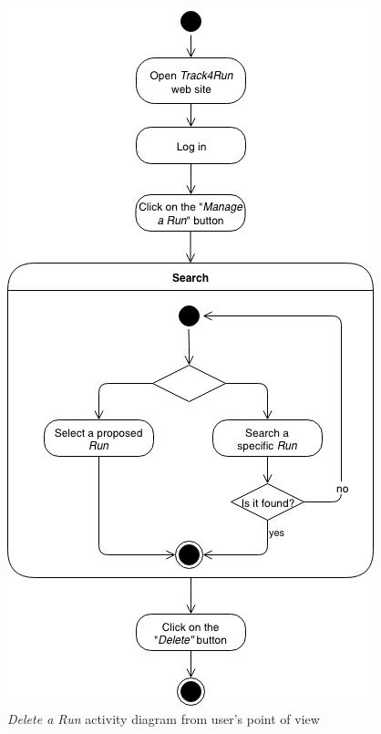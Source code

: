 \begin{figure}[H]
\begin{center}
  \includegraphics[height=0.6\paperheight]{img/activity/DeleteRun.png}
  \hspace{0.05\linewidth}
  \centering
  \caption{\textit{Delete a Run} activity diagram from user's point of view}
  \label{img:deleteRunActivityDiagram}
\end{center}
\end{figure}

